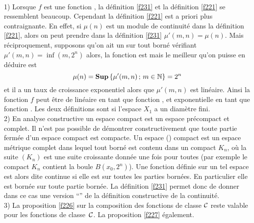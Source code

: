 \begin{fremarks}\label{f233} ~\\
1)	Lorsque  $f$  est une fonction \unico, la définition \ref{f231} et la 
définition \ref{f221} se ressemblent beaucoup. Cependant la définition 
\ref{f221} est a priori plus contraignante. En effet, si $\mu(n)$  est un module 
de continuité dans la définition \ref{f221}, alors on peut prendre dans la 
définition \ref{f231}  $\mu'(m,n) = \mu(n)$. Mais réciproquement, supposons 
qu'on ait un \mcu sur tout borné vérifiant  $\mu'(m,n) = \inf(m, 2^n)$   
alors, la fonction est \unico mais le meilleur \mcu qu'on puisse en déduire 
est  
$$\mu(n) = {\bf Sup} \left\{ \mu'(m,n)\,;\, m \in \mathbb {N} \right\} = 2^n$$
et il a un taux de croissance exponentiel alors que  $\mu'(m,n)$  est 
linéaire. Ainsi la fonction  $f$  peut être de \com linéaire en tant que 
fonction \loca \unico, et exponentielle en tant que fonction \unico.  
Les deux définitions sont \equivas si l'espace  $X_1$  a un diamètre fini.
\\
2)	En analyse constructive un espace compact est un espace précompact et 
complet. Il n'est pas possible de démontrer constructivement que toute partie 
fermée d'un espace compact est compacte. Un espace 
(\uniz) \loca compact est un espace métrique complet dans lequel tout borné 
est contenu dans un compact  $K_n$,  où la suite  $(K_n)$  est une suite 
croissante donnée une fois pour toutes (par exemple le compact  $K_n$  
contient la boule  $B(x_0, 2^n)$). Une fonction définie sur un tel espace est 
alors dite continue si elle est \unico sur toutes les parties bornées.  En 
particulier elle est bornée sur toute partie bornée. La définition 
\ref{f231} permet donc de donner dans ce cas une version ``\com'' de la 
définition constructive de la continuité.
\\
3)	La proposition \ref{f226} sur la composition des fonctions \uni de classe 
${{\cal C}}$  reste valable pour les fonctions \loca \uni de classe~${{\cal C}}$. La 
proposition \ref{f227} également.
\end{fremarks}


